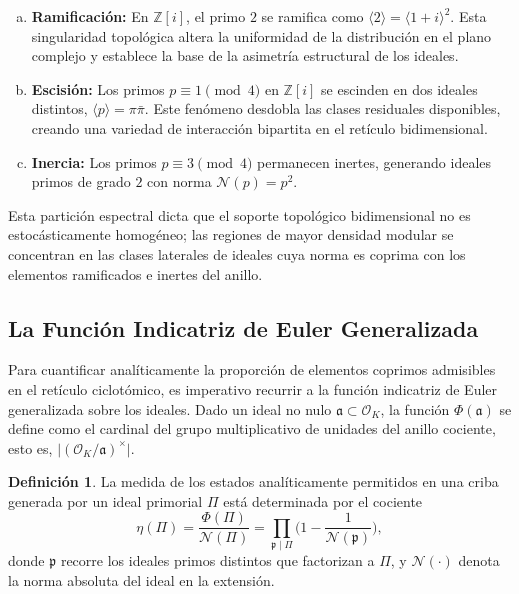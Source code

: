 \documentclass{article}
\numberwithin{equation}{section}
\theoremstyle{plain}
\theoremstyle{definition}
\newtheorem{definicion}[teorema]{Definición}
\begin{document}
\begin{enumerate}[(a)]
    \item \textbf{Ramificación:} En $\mathbb{Z}[i]$, el primo $2$ se ramifica como $\langle 2 \rangle = \langle 1+i \rangle^2$. Esta singularidad topológica altera la uniformidad de la distribución en el plano complejo y establece la base de la asimetría estructural de los ideales.
    \item \textbf{Escisión:} Los primos $p \equiv 1 \pmod 4$ en $\mathbb{Z}[i]$ se escinden en dos ideales distintos, $\langle p \rangle = \pi \bar{\pi}$. Este fenómeno desdobla las clases residuales disponibles, creando una variedad de interacción bipartita en el retículo bidimensional.
    \item \textbf{Inercia:} Los primos $p \equiv 3 \pmod 4$ permanecen inertes, generando ideales primos de grado $2$ con norma $\mathcal{N}(p) = p^2$.
\end{enumerate}

Esta partición espectral dicta que el soporte topológico bidimensional no es estocásticamente homogéneo; las regiones de mayor densidad modular se concentran en las clases laterales de ideales cuya norma es coprima con los elementos ramificados e inertes del anillo.

\subsection{La Función Indicatriz de Euler Generalizada}

Para cuantificar analíticamente la proporción de elementos coprimos admisibles en el retículo ciclotómico, es imperativo recurrir a la función indicatriz de Euler generalizada sobre los ideales. Dado un ideal no nulo $\mathfrak{a} \subset \mathcal{O}_K$, la función $\Phi(\mathfrak{a})$ se define como el cardinal del grupo multiplicativo de unidades del anillo cociente, esto es, $\lvert(\mathcal{O}_K/\mathfrak{a})^\times\rvert$.

\begin{definicion}
La medida de los estados analíticamente permitidos en una criba generada por un ideal primorial $\Pi$ está determinada por el cociente
\begin{equation}
    \eta(\Pi) = \frac{\Phi(\Pi)}{\mathcal{N}(\Pi)} = \prod_{\mathfrak{p} \mid \Pi} \bigg( 1 - \frac{1}{\mathcal{N}(\mathfrak{p})} \bigg),
\end{equation}
donde $\mathfrak{p}$ recorre los ideales primos distintos que factorizan a $\Pi$, y $\mathcal{N}(\cdot)$ denota la norma absoluta del ideal en la extensión.
\end{definicion}
\end{document}
